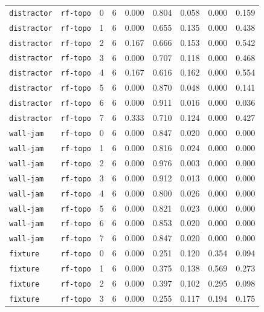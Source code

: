 \documentclass{article}
\begin{document}
\begin{center}
\begin{tabular}{lllcccccc}
\texttt{distractor} & \texttt{rf-topo} & 0 & 6 & 0.000 & 0.804 & 0.058 & 0.000 & 0.159 \\
\texttt{distractor} & \texttt{rf-topo} & 1 & 6 & 0.000 & 0.655 & 0.135 & 0.000 & 0.438 \\
\texttt{distractor} & \texttt{rf-topo} & 2 & 6 & 0.167 & 0.666 & 0.153 & 0.000 & 0.542 \\
\texttt{distractor} & \texttt{rf-topo} & 3 & 6 & 0.000 & 0.707 & 0.118 & 0.000 & 0.468 \\
\texttt{distractor} & \texttt{rf-topo} & 4 & 6 & 0.167 & 0.616 & 0.162 & 0.000 & 0.554 \\
\texttt{distractor} & \texttt{rf-topo} & 5 & 6 & 0.000 & 0.870 & 0.048 & 0.000 & 0.141 \\
\texttt{distractor} & \texttt{rf-topo} & 6 & 6 & 0.000 & 0.911 & 0.016 & 0.000 & 0.036 \\
\texttt{distractor} & \texttt{rf-topo} & 7 & 6 & 0.333 & 0.710 & 0.124 & 0.000 & 0.427 \\
\texttt{wall-jam} & \texttt{rf-topo} & 0 & 6 & 0.000 & 0.847 & 0.020 & 0.000 & 0.000 \\
\texttt{wall-jam} & \texttt{rf-topo} & 1 & 6 & 0.000 & 0.816 & 0.024 & 0.000 & 0.000 \\
\texttt{wall-jam} & \texttt{rf-topo} & 2 & 6 & 0.000 & 0.976 & 0.003 & 0.000 & 0.000 \\
\texttt{wall-jam} & \texttt{rf-topo} & 3 & 6 & 0.000 & 0.912 & 0.013 & 0.000 & 0.000 \\
\texttt{wall-jam} & \texttt{rf-topo} & 4 & 6 & 0.000 & 0.800 & 0.026 & 0.000 & 0.000 \\
\texttt{wall-jam} & \texttt{rf-topo} & 5 & 6 & 0.000 & 0.821 & 0.023 & 0.000 & 0.000 \\
\texttt{wall-jam} & \texttt{rf-topo} & 6 & 6 & 0.000 & 0.853 & 0.020 & 0.000 & 0.000 \\
\texttt{wall-jam} & \texttt{rf-topo} & 7 & 6 & 0.000 & 0.847 & 0.020 & 0.000 & 0.000 \\
\texttt{fixture} & \texttt{rf-topo} & 0 & 6 & 0.000 & 0.251 & 0.120 & 0.354 & 0.094 \\
\texttt{fixture} & \texttt{rf-topo} & 1 & 6 & 0.000 & 0.375 & 0.138 & 0.569 & 0.273 \\
\texttt{fixture} & \texttt{rf-topo} & 2 & 6 & 0.000 & 0.397 & 0.102 & 0.295 & 0.098 \\
\texttt{fixture} & \texttt{rf-topo} & 3 & 6 & 0.000 & 0.255 & 0.117 & 0.194 & 0.175 \\
\bottomrule
\end{tabular}
\end{center}
\end{document}
